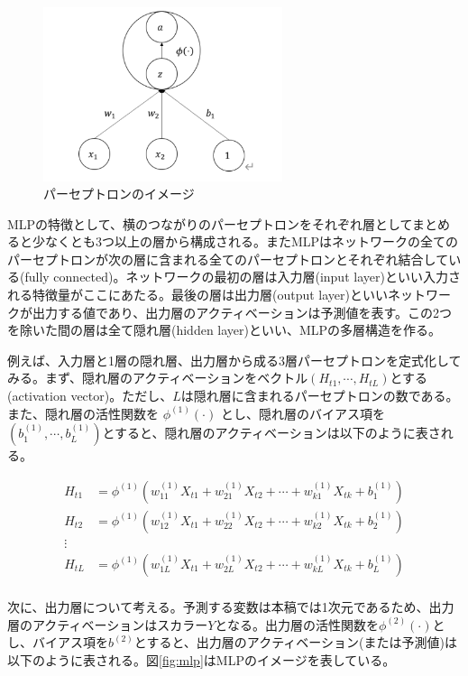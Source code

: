 \documentclass[a4paper, 12pt]{jsarticle}
\begin{document}
\begin{figure}
  \centering
  \caption{パーセプトロンのイメージ}
  \label{fig:perceptron}
  \includegraphics[width=7cm]{./img/_ann_unit.png}
\end{figure}

MLPの特徴として、横のつながりのパーセプトロンをそれぞれ層としてまとめると少なくとも3つ以上の層から構成される。またMLPはネットワークの全てのパーセプトロンが次の層に含まれる全てのパーセプトロンとそれぞれ結合している(fully connected)。ネットワークの最初の層は入力層(input layer)といい入力される特徴量がここにあたる。最後の層は出力層(output layer)といいネットワークが出力する値であり、出力層のアクティベーションは予測値を表す。この2つを除いた間の層は全て隠れ層(hidden layer)といい、MLPの多層構造を作る。

例えば、入力層と1層の隠れ層、出力層から成る3層パーセプトロンを定式化してみる。まず、隠れ層のアクティベーションをベクトル$(H_{t1}, \cdots, H_{tL})$とする(activation vector)。ただし、$L$は隠れ層に含まれるパーセプトロンの数である。また、隠れ層の活性関数を $\phi^{(1)}(\cdot)$ とし、隠れ層のバイアス項を$(b^{(1)}_1, \cdots, b^{(1)}_L)$とすると、隠れ層のアクティベーションは以下のように表される。

\begin{equation}
  \begin{split}
    H_{t1} &= \phi^{(1)}(w^{(1)}_{11} X_{t1} + w^{(1)}_{21} X_{t2} + \cdots + w^{(1)}_{k1} X_{tk} + b^{(1)}_1) \\
    H_{t2} &= \phi^{(1)}(w^{(1)}_{12} X_{t1} + w^{(1)}_{22} X_{t2} + \cdots + w^{(1)}_{k2} X_{tk} + b^{(1)}_2) \\
    \vdots \\
    H_{tL} &= \phi^{(1)}(w^{(1)}_{1L} X_{t1} + w^{(1)}_{2L} X_{t2} + \cdots + w^{(1)}_{kL} X_{tk} + b^{(1)}_L) \\
  \end{split}
\end{equation}

 次に、出力層について考える。予測する変数は本稿では1次元であるため、出力層のアクティベーションはスカラー$Y$となる。出力層の活性関数を$\phi^{(2)}(\cdot)$とし、バイアス項を$b^{(2)}$とすると、出力層のアクティベーション(または予測値)は以下のように表される。図\ref{fig:mlp}はMLPのイメージを表している。
\end{document}
